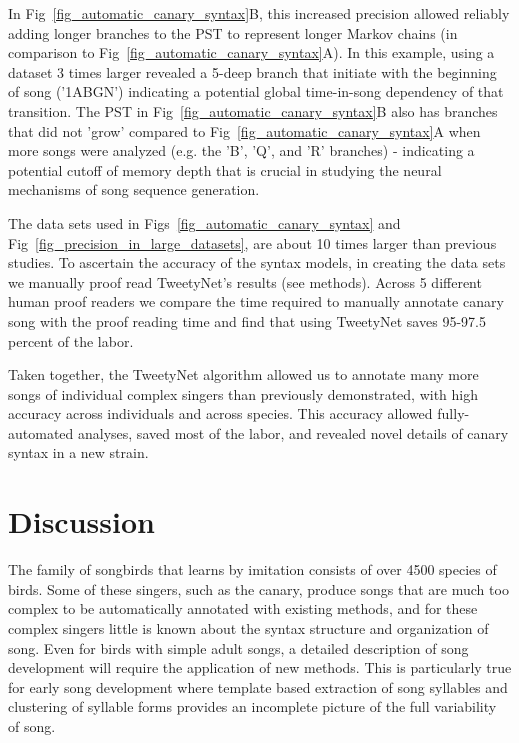 \documentclass[10pt,letterpaper]{article}
\begin{document}
In Fig~\ref{fig_automatic_canary_syntax}B, this increased precision allowed reliably adding longer branches to the PST to represent longer Markov chains (in comparison to Fig~\ref{fig_automatic_canary_syntax}A). In this example, using a dataset 3 times larger revealed a 5-deep branch that initiate with the beginning of song ('1ABGN') indicating a potential global time-in-song dependency of that transition. The PST in Fig~\ref{fig_automatic_canary_syntax}B also has branches that did not 'grow' compared to Fig~\ref{fig_automatic_canary_syntax}A when more songs were analyzed (e.g. the 'B', 'Q', and 'R' branches) - indicating a potential cutoff of memory depth that is crucial in studying the neural mechanisms of song sequence generation. 

The data sets used in Figs~\ref{fig_automatic_canary_syntax} and Fig~\ref{fig_precision_in_large_datasets}, are about 10 times larger than previous studies. To ascertain the accuracy of the syntax models, in creating the data sets we manually proof read TweetyNet's results (see methods). Across 5 different human proof readers we compare the time required to manually annotate canary song with the proof reading time and find that using TweetyNet saves 95-97.5 percent of the labor.
\newline

Taken together, the TweetyNet algorithm allowed us to annotate many more songs of individual complex singers than previously demonstrated, with high accuracy across individuals and across species. This accuracy allowed fully-automated analyses, saved most of the labor, and revealed novel details of canary syntax in a new strain.    

\section*{Discussion}
\label{Discussion}
The family of songbirds that learns by imitation consists of over 4500 species of birds. Some of these singers, such as the canary, produce songs that are much too complex to be automatically annotated with existing methods, and for these complex singers little is known about the syntax structure and organization of song. Even for birds with simple adult songs, a detailed description of song development will require the application of new methods. This is particularly true for early song development where template based extraction of song syllables and clustering of syllable forms provides an incomplete picture of the full variability of song. 
\end{document}

